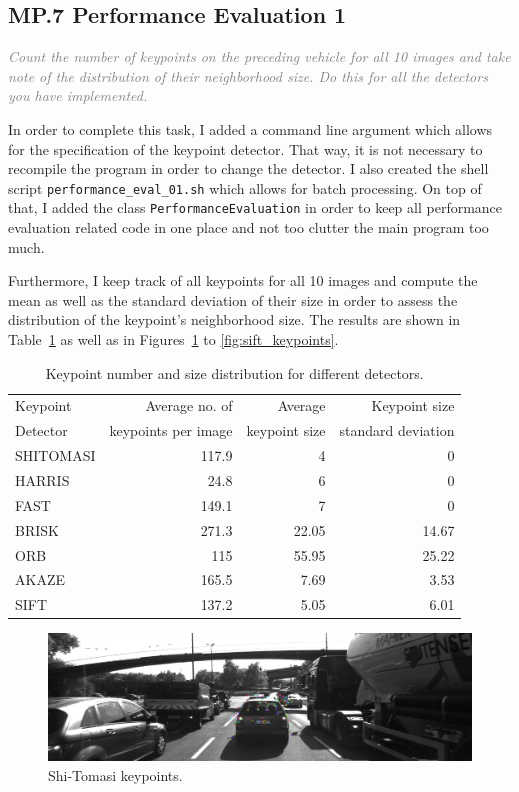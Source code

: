\documentclass[a4paper]{scrartcl}
\begin{document}
\subsection*{MP.7 Performance Evaluation 1}
\textcolor{gray}{\textit{Count the number of keypoints on the preceding vehicle for all 10 images and take note of the distribution of their neighborhood size. Do this for all the detectors you have implemented.}}

In order to complete this task, I added a command line argument which allows for the
specification of the keypoint detector. That way, it is not necessary to recompile the program
in order to change the detector.
I also created the shell script \texttt{performance\_eval\_01.sh} which allows for
batch processing.
On top of that, I added the class \texttt{PerformanceEvaluation} in order
to keep all performance evaluation related code in one place and not too clutter
the main program too much.

Furthermore, I keep track of all keypoints for all 10 images and compute the mean as well
as the standard deviation of their size in order to assess the distribution of the
keypoint's neighborhood size. The results are shown in Table~\ref{tab:performance_1}
as well as in Figures~\ref{fig:shi_tomasi_keypoints} to \ref{fig:sift_keypoints}.

\begin{table}
	\caption{Keypoint number and size distribution for different detectors.}
	\label{tab:performance_1}
	\begin{tabular}{l||r|r|r}
		Keypoint & Average no. of  		& Average  		& Keypoint size	\\
		Detector & keypoints per image 	& keypoint size 	& standard deviation 	\\
		\hline \hline
		SHITOMASI & 117.9 & 4 & 0 \\
		HARRIS & 24.8 & 6 & 0 \\
		FAST & 149.1 & 7 & 0 \\
		BRISK & 271.3 & 22.05 & 14.67 \\
		ORB & 115 & 55.95 & 25.22 \\
		AKAZE & 165.5 & 7.69 & 3.53 \\
		SIFT & 137.2 & 5.05 & 6.01 \\
		\hline
	\end{tabular}
\end{table}

\begin{figure}
	\centering
	\includegraphics[width=0.8\columnwidth]{./keypoints/SHITOMASI}
	\caption{Shi-Tomasi keypoints.}
	\label{fig:shi_tomasi_keypoints}
\end{figure}
\end{document}
